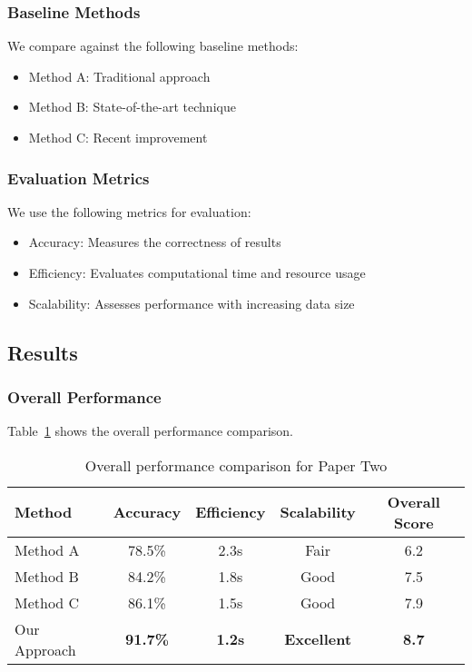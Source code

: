\subsubsection{Baseline Methods}
We compare against the following baseline methods:
\begin{itemize}
    \item Method A: Traditional approach \cite{example-reference-9}
    \item Method B: State-of-the-art technique \cite{example-reference-10}
    \item Method C: Recent improvement \cite{example-reference-11}
\end{itemize}

\subsubsection{Evaluation Metrics}
We use the following metrics for evaluation:
\begin{itemize}
    \item Accuracy: Measures the correctness of results
    \item Efficiency: Evaluates computational time and resource usage
    \item Scalability: Assesses performance with increasing data size
\end{itemize}

\subsection{Results}

\subsubsection{Overall Performance}

Table~\ref{tab:papertwo-overall} shows the overall performance comparison.

\begin{table}[!htb]
\centering
\caption{Overall performance comparison for Paper Two}
\label{tab:papertwo-overall}
\begin{tabular}{@{}lcccc@{}}
\toprule
Method & Accuracy & Efficiency & Scalability & Overall Score \\
\midrule
Method A & 78.5\% & 2.3s & Fair & 6.2 \\
Method B & 84.2\% & 1.8s & Good & 7.5 \\
Method C & 86.1\% & 1.5s & Good & 7.9 \\
Our Approach & \textbf{91.7\%} & \textbf{1.2s} & \textbf{Excellent} & \textbf{8.7} \\
\bottomrule
\end{tabular}
\end{table}

